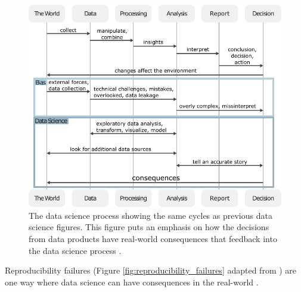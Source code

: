 \documentclass[../main.tex]{subfiles}
\begin{document}
    \begin{figure}[!hbtp]
        \centering
        \includegraphics[scale=0.8]{figs/050-intro/data_science_figure}
        \caption[Data Science and It's Consequences]{
        The data science process showing the same cycles as previous data science figures.
        This figure puts an emphasis on how the decisions from data products have real-world consequences that feedback into
        the data science process \cite{Chen2020}.
        }
        \label{fig:data_science_consequences}
    \end{figure}

    Reproducibility failures (Figure \ref{fig:reproducibility_failures} adapted
    from \cite{ostblomOpinionatedPracticesTeaching2021}) are one way where data
    science can have consequences in the real-world
    \cite{aboumatarNoticeRetractionAboumatar2019, ExcelWhyUsing2020,
    ostblomOpinionatedPracticesTeaching2021,
    wallensteenRetractionNoticeEvaluation2018,
    whitehouseRetractionNoteComplex2021, zeebergMistakenIdentifiersGene2004,
    ziemannGeneNameErrors2016}.
\end{document}
